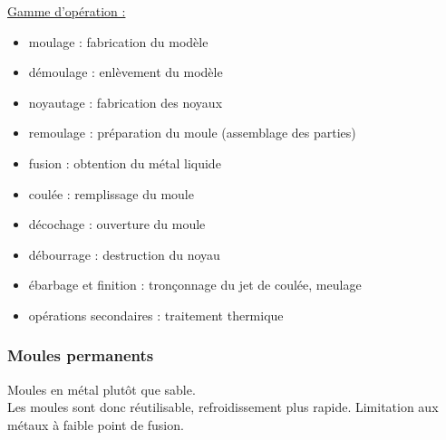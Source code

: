 \documentclass[../main.tex]{subfiles}
\begin{document}
\quad \underline{Gamme d'opération :}\\
\begin{itemize}
    \item moulage : fabrication du modèle\\
    \item démoulage : enlèvement du modèle\\
    \item noyautage : fabrication des noyaux\\
    \item remoulage : préparation du moule (assemblage des parties)\\
    \item fusion : obtention du métal liquide\\
    \item coulée : remplissage du moule\\
    \item décochage : ouverture du moule\\
    \item débourrage : destruction du noyau\\
    \item ébarbage et finition : tronçonnage du jet de coulée, meulage\\
    \item opérations secondaires : traitement thermique\\
\end{itemize}

\subsubsection{Moules permanents}
Moules en métal plutôt que sable.\\
Les moules sont donc réutilisable, refroidissement plus rapide. Limitation aux métaux à faible point de fusion.\\
\end{document}
